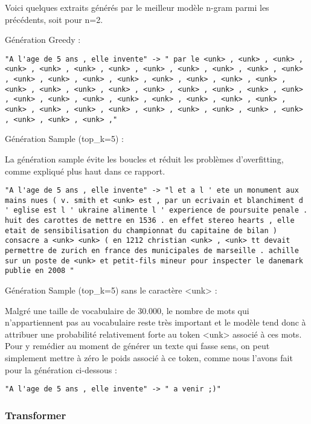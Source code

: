 Voici quelques extraits générés par le meilleur modèle n-gram parmi les précédents, soit pour n=2.

Génération Greedy :

\begin{verbatim}
"A l'age de 5 ans , elle invente" -> " par le <unk> , <unk> , <unk> , <unk> , <unk> , <unk> , <unk> , <unk> , <unk> , <unk> , <unk> , <unk> , <unk> , <unk> , <unk> , <unk> , <unk> , <unk> , <unk> , <unk> , <unk> , <unk> , <unk> , <unk> , <unk> , <unk> , <unk> , <unk> , <unk> , <unk> , <unk> , <unk> , <unk> , <unk> , <unk> , <unk> , <unk> , <unk> , <unk> , <unk> , <unk> , <unk> , <unk> , <unk> , <unk> , <unk> , <unk> , <unk> , <unk> ,"
\end{verbatim}

Génération Sample (top_k=5) :

La génération sample évite les boucles et réduit les problèmes d'overfitting, comme expliqué plus haut dans ce rapport.

\begin{verbatim}
"A l'age de 5 ans , elle invente" -> "l et a l ' ete un monument aux mains nues ( v. smith et <unk> est , par un ecrivain et blanchiment d ' eglise est l ' ukraine alimente l ' experience de poursuite penale . huit des carottes de mettre en 1536 . en effet stereo hearts , elle etait de sensibilisation du championnat du capitaine de bilan ) consacre a <unk> <unk> ( en 1212 christian <unk> , <unk> tt devait permettre de zurich en france des municipales de marseille . achille sur un poste de <unk> et petit-fils mineur pour inspecter le danemark publie en 2008 "
\end{verbatim}

Génération Sample (top_k=5) sans le caractère <unk> :

Malgré une taille de vocabulaire de 30.000, le nombre de mots qui n’appartiennent pas au vocabulaire reste très important et le modèle tend donc à attribuer une probabilité relativement forte au token <unk> associé à ces mots. Pour y remédier au moment de générer un texte qui fasse sens, on peut simplement mettre à zéro le poids associé à ce token, comme nous l’avons fait pour la génération ci-dessous :

\begin{verbatim}
"A l'age de 5 ans , elle invente" -> " a venir ;)"
\end{verbatim}

\hypertarget{transformer}{%
\subsubsection{Transformer}\label{transformer}}

